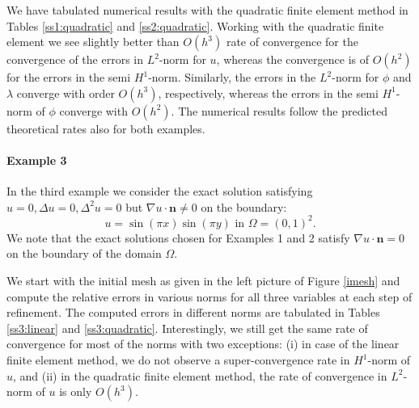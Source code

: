 \documentclass[a4paper,final]{siamltex}
\begin{document}
We have tabulated numerical results with the quadratic finite element method in 
Tables \ref{ss1:quadratic} and \ref{ss2:quadratic}. 
Working with the quadratic finite element we see slightly better than $O(h^{3})$ rate of 
convergence for the convergence of the errors in $L^2$-norm for $u$, whereas 
the convergence is of $O(h^{2})$ for the errors in the semi $H^1$-norm. Similarly, 
the errors in the $L^2$-norm for $\phi$ and $\lambda$ converge with order 
$O(h^3)$, respectively, whereas the errors in the semi $H^1$-norm of $\phi$ converge with $O(h^2)$. 
The numerical results follow the predicted theoretical rates also for both examples.

\paragraph{Example 3} 
In the third example we consider the exact solution satisfying 
$u=0,\Delta u=0, \Delta^2 u = 0$ but $\nabla u\cdot \mathbf{n}\neq 0$ on the boundary:
\begin{equation} \label{exa3}
u = \sin\left(\pi x\right) \sin\left(\pi y\right) \text{ in } \Omega =\left( 0,1\right)^{2}.
\end{equation}
We note that the exact solutions chosen for Examples 1 and 2 satisfy 
 $\nabla u\cdot \mathbf{n} = 0$ on the boundary of the domain $\Omega$.

We start with the initial mesh as given in the left picture of Figure \ref{imesh}
and compute the relative errors in various norms for all  three variables at each step of refinement.
The computed errors in different norms are tabulated in Tables \ref{ss3:linear} and 
\ref{ss3:quadratic}. 
Interestingly, we still get the same rate of convergence for most of the norms with two exceptions: (i) in case of the linear finite element method, we do not observe a super-convergence rate in $H^1$-norm of $u$, and (ii) in the quadratic finite element method, the rate of convergence in $L^2$-norm of $u$ is only $O(h^3)$.
\end{document}
